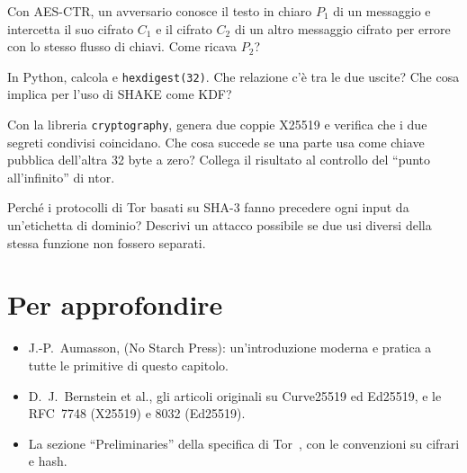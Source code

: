 \begin{esercizio}[1]\label{es:05-xor}
Con AES-CTR, un avversario conosce il testo in chiaro $P_1$ di un messaggio e intercetta il suo cifrato $C_1$ e il cifrato $C_2$ di un altro messaggio cifrato per errore con lo stesso flusso di chiavi. Come ricava $P_2$?
\end{esercizio}

\begin{esercizio}[1]\label{es:05-shake}
In Python, calcola  e \texttt{hexdigest(32)}. Che relazione c'è tra le due uscite? Che cosa implica per l'uso di SHAKE come KDF?
\end{esercizio}

\begin{esercizio}[2]\label{es:05-dh}
Con la libreria \texttt{cryptography}, genera due coppie X25519 e verifica che i due segreti condivisi coincidano. Che cosa succede se una parte usa come chiave pubblica dell'altra 32 byte a zero? Collega il risultato al controllo del \enquote{punto all'infinito} di ntor.
\end{esercizio}

\begin{esercizio}[2]\label{es:05-etichette}
Perché i protocolli di Tor basati su SHA-3 fanno precedere ogni input da un'etichetta di dominio? Descrivi un attacco possibile se due usi diversi della stessa funzione non fossero separati.
\end{esercizio}

\section*{Per approfondire}
\begin{itemize}
  \item J.-P.~Aumasson,  (No Starch Press): un'introduzione moderna e pratica a tutte le primitive di questo capitolo.
  \item D.~J.~Bernstein et al., gli articoli originali su Curve25519 ed Ed25519, e le RFC~7748 (X25519) e 8032 (Ed25519).
  \item La sezione \enquote{Preliminaries} della specifica di Tor~\cite{torspec}, con le convenzioni su cifrari e hash.
\end{itemize}
